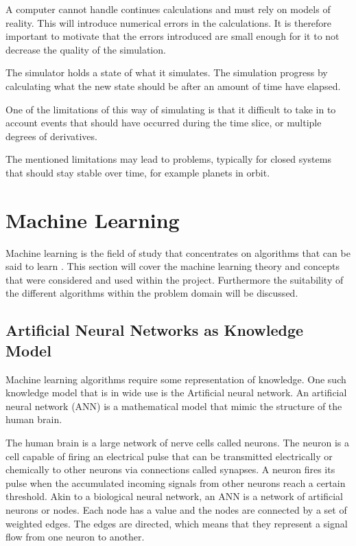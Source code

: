 A computer cannot handle continues calculations and must rely on models of reality. This will introduce numerical errors in the calculations. It is therefore important to motivate that the errors introduced are small enough for it to not decrease the quality of the simulation.

The simulator holds a state of what it simulates. The simulation progress by calculating what the new state should be after an amount of time have elapsed.

One of the limitations of this way of simulating is that it difficult to take in to account events that should have occurred during the time slice, or multiple degrees of derivatives. 

The mentioned limitations may lead to problems, typically for closed systems that should stay stable over time, for example planets in orbit. 


\section{Machine Learning}
Machine learning is the field of study that concentrates on algorithms that can be said to learn \cite{glossary}. This section will cover the machine learning theory and concepts that were considered and used within the project. Furthermore the suitability of the different algorithms within the problem domain will be discussed.  

\subsection{Artificial Neural Networks as Knowledge Model}
Machine learning algorithms require some representation of knowledge. One such knowledge model that is in wide use is the Artificial neural network. An artificial neural network (ANN) is a mathematical model that mimic the structure of the human brain. 

The human brain is a large network of nerve cells called neurons. The neuron is a cell capable of firing an electrical pulse that can be transmitted electrically or chemically to other neurons via connections called synapses. A neuron fires its pulse when the accumulated incoming signals from other neurons reach a certain threshold. Akin to a biological neural network, an ANN is a network of artificial neurons or nodes. Each node has a value and the nodes are connected by a set of weighted edges. The edges are directed, which means that they represent a signal flow from one neuron to another.

